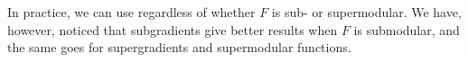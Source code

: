 
In practice, we can use  regardless of whether $F$ is sub- or supermodular.
We have, however, noticed that subgradients give better results when $F$ is submodular, and the same goes for supergradients and supermodular functions.

